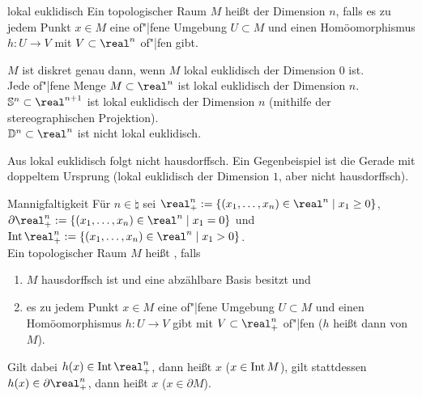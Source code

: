\begin{Def}{lokal euklidisch}
    Ein topologischer Raum $M$ heißt  der
    Dimension $n$, falls es zu jedem Punkt $x \in M$ eine of"|fene Umgebung
    $U \subset M$ und einen Homöomorphismus $h\colon U \rightarrow V$
    mit $V \subset \real^n$ of"|fen gibt.
\end{Def}

\begin{Bsp}
    $M$ ist diskret genau dann, wenn $M$ lokal euklidisch der Dimension $0$
    ist. \\
    Jede of"|fene Menge $M \subset \real^n$ ist lokal euklidisch der
    Dimension $n$. \\
    $\sphere^n \subset \real^{n+1}$ ist lokal euklidisch der Dimension $n$
    (mithilfe der stereographischen Projektion). \\
    $\dball^n \subset \real^n$ ist nicht lokal euklidisch.
\end{Bsp}

\begin{Bem}
    Aus lokal euklidisch folgt nicht hausdorffsch.
    Ein Gegenbeispiel ist die Gerade mit doppeltem Ursprung
    (lokal euklidisch der Dimension $1$, aber nicht hausdorffsch).
\end{Bem}

\linie

\begin{Def}{Mannigfaltigkeit}
    Für $n \in \natural$ sei
    $\real^n_+ := \{(x_1, \dotsc, x_n) \in \real^n \;|\; x_1 \ge 0\}$, \\
    $\partial \real^n_+ := \{(x_1, \dotsc, x_n) \in \real^n \;|\; x_1 = 0\}$
    und $\Int \real^n_+ := \{(x_1, \dotsc, x_n) \in \real^n
    \;|\; x_1 > 0\}$. \\
    Ein topologischer Raum $M$ heißt , falls
    \begin{enumerate}
        \item
        $M$ hausdorffsch ist und eine abzählbare Basis besitzt und
        
        \item
        es zu jedem Punkt $x \in M$ eine of"|fene Umgebung $U \subset M$ und
        einen Homöomorphismus $h\colon U \rightarrow V$ gibt mit
        $V \subset \real^n_+$ of"|fen
        ($h$ heißt dann  von $M$).
    \end{enumerate}
    Gilt dabei $h(x) \in \Int \real^n_+$,
    dann heißt $x$  ($x \in \operatorname{Int} M$),
    gilt stattdessen $h(x) \in \partial \real^n_+$,
    dann heißt $x$  ($x \in \partial M$).
\end{Def}

